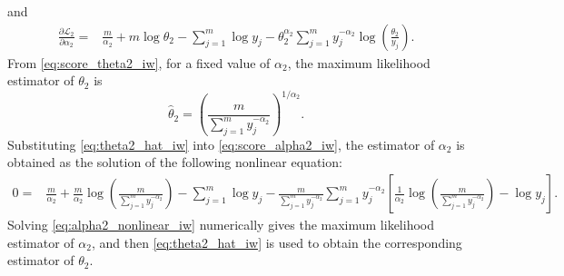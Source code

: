 \documentclass[twoside]{article}
\begin{document}
and
\begin{align}
	\frac{\partial \mathcal{L}_2}{\partial \alpha_2}
	=&\frac{m}{\alpha_2}+m\log\theta_2
	-\sum_{j=1}^{m}\log y_j
	-\theta_2^{\alpha_2}
	\sum_{j=1}^{m}y_j^{-\alpha_2}
	\log\left(\frac{\theta_2}{y_j}\right).
	\label{eq:score_alpha2_iw}
\end{align}
From \eqref{eq:score_theta2_iw}, for a fixed value of $\alpha_2$, the maximum likelihood estimator of $\theta_2$ is
\begin{equation}\label{eq:theta2_hat_iw}
	\hat{\theta}_2=
	\left(
	\frac{m}{\sum_{j=1}^{m}y_j^{-\alpha_2}}
	\right)^{1/\alpha_2}.
\end{equation}
Substituting \eqref{eq:theta2_hat_iw} into \eqref{eq:score_alpha2_iw}, the estimator of $\alpha_2$ is obtained as the solution of the following nonlinear equation:
\begin{align}
	0=&\frac{m}{\alpha_2}
	+\frac{m}{\alpha_2}
	\log\left(
	\frac{m}{\sum_{j=1}^{m}y_j^{-\alpha_2}}
	\right)
	-\sum_{j=1}^{m}\log y_j -
	\frac{m}{\sum_{j=1}^{m}y_j^{-\alpha_2}}
	\sum_{j=1}^{m}
	y_j^{-\alpha_2}
	\left[
	\frac{1}{\alpha_2}
	\log\left(
	\frac{m}{\sum_{j=1}^{m}y_j^{-\alpha_2}}
	\right)
	-\log y_j
	\right].
	\label{eq:alpha2_nonlinear_iw}
\end{align}
Solving \eqref{eq:alpha2_nonlinear_iw} numerically gives the maximum likelihood estimator of $\alpha_2$, and then \eqref{eq:theta2_hat_iw} is used to obtain the corresponding estimator of $\theta_2$.
\vspace{-0.5cm}
\end{document}
